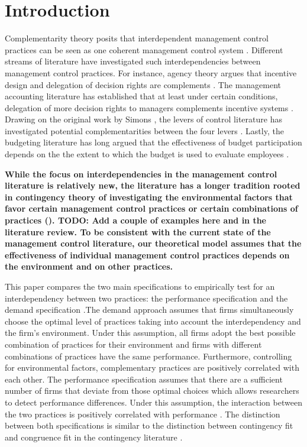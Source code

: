 \documentclass[12pt]{article}
\begin{document}
\section{Introduction}\label{introduction}

Complementarity theory posits that interdependent management control
practices can be seen as one coherent management control system
\citep{Milgrom1995, Grabner2013}. Different streams of literature have
investigated such interdependencies between management control
practices. For instance, agency theory argues that incentive design and
delegation of decision rights are complements \citep{Holmstrom1994}. The
management accounting literature has established that at least under
certain conditions, delegation of more decision rights to managers
complements incentive systems
\citep{Moers2006, Indjejikian2012, Bouwens2007}. Drawing on the original
work by Simons \citetext{\citeyear{Simons1995}; \citeyear{Simons2000}},
the levers of control literature has investigated potential
complementarities between the four levers \citep{Widener2007}. Lastly,
the budgeting literature has long argued that the effectiveness of
budget participation depends on the the extent to which the budget is
used to evaluate employees \citep{Brownell1991, Dunk1993}.

\textbf{While the focus on interdependencies in the management control
literature is relatively new, the literature has a longer tradition
rooted in contingency theory of investigating the environmental factors
that favor certain management control practices or certain combinations
of practices (\citet{Grabner2013}). TODO: Add a couple of examples here
and in the literature review. To be consistent with the current state of
the management control literature, our theoretical model assumes that
the effectiveness of individual management control practices depends on
the environment and on other practices.}

This paper compares the two main specifications to empirically test for
an interdependency between two practices: the performance specification
and the demand specification \citep{Grabner2013}.The demand approach
assumes that firms simultaneously choose the optimal level of practices
taking into account the interdependency and the firm's environment.
Under this assumption, all firms adopt the best possible combination of
practices for their environment and firms with different combinations of
practices have the same performance. Furthermore, controlling for
environmental factors, complementary practices are positively correlated
with each other. The performance specification assumes that there are a
sufficient number of firms that deviate from those optimal choices which
allows researchers to detect performance differences. Under this
assumption, the interaction between the two practices is positively
correlated with performance \citep{Athey1998, Grabner2013}. The
distinction between both specifications is similar to the distinction
between contingency fit and congruence fit in the contingency literature
\citep{VandeVen1985a, Gerdin2004}.
\end{document}
